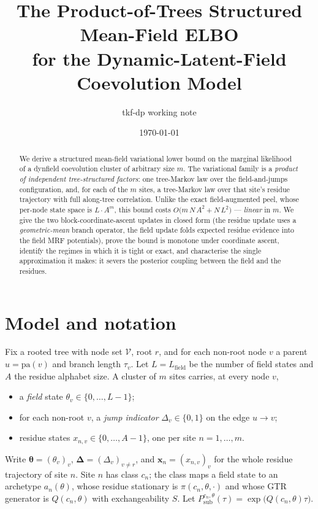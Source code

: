 \documentclass[11pt]{article}
\title{The Product-of-Trees Structured Mean-Field ELBO\\for the Dynamic-Latent-Field Coevolution Model}
\author{tkf-dp working note}
\date{\today}
\newcommand{\btheta}{\bm{\theta}}
\newcommand{\bDelta}{\bm{\Delta}}
\newcommand{\bx}{\bm{x}}
\newcommand{\pa}{\mathrm{pa}}
\newcommand{\Psub}{P_{\mathrm{sub}}}
\begin{document}
\maketitle

\begin{abstract}
We derive a structured mean-field variational lower bound on the marginal
likelihood of a dynfield coevolution cluster of arbitrary size $m$. The
variational family is a \emph{product of independent tree-structured
factors}: one tree-Markov law over the field-and-jumps configuration, and,
for each of the $m$ sites, a tree-Markov law over that site's residue
trajectory with full along-tree correlation. Unlike the exact
field-augmented peel, whose per-node state space is $L\cdot A^{m}$, this
bound costs $O\!\big(m\,N\,A^{2}+N\,L^{2}\big)$ --- \emph{linear} in $m$.
We give the two block-coordinate-ascent updates in closed form (the residue
update uses a \emph{geometric-mean} branch operator, the field update folds
expected residue evidence into the field MRF potentials), prove the bound is
monotone under coordinate ascent, identify the regimes in which it is tight
or exact, and characterise the single approximation it makes: it severs the
posterior coupling between the field and the residues.
\end{abstract}

\section{Model and notation}

Fix a rooted tree with node set $\mathcal V$, root $r$, and for each
non-root node $v$ a parent $u=\pa(v)$ and branch length $\tau_v$. Let
$L=L_{\mathrm{field}}$ be the number of field states and $A$ the residue
alphabet size. A cluster of $m$ sites carries, at every node $v$,
\begin{itemize}
\item a \emph{field} state $\theta_v\in\{0,\dots,L-1\}$;
\item for each non-root $v$, a \emph{jump indicator} $\Delta_v\in\{0,1\}$ on
      the edge $u\to v$;
\item residue states $x_{n,v}\in\{0,\dots,A-1\}$, one per site $n=1,\dots,m$.
\end{itemize}
Write $\btheta=(\theta_v)_v$, $\bDelta=(\Delta_v)_{v\neq r}$, and
$\bx_n=(x_{n,v})_v$ for the whole residue trajectory of site $n$. Site $n$
has class $c_n$; the class maps a field state to an archetype
$a_n(\theta)$, whose residue stationary is $\pi(c_n,\theta,\cdot)$ and whose
GTR generator is $Q(c_n,\theta)$ with exchangeability $S$. Let
$\Psub^{c_n,\theta}(\tau)=\exp\!\big(Q(c_n,\theta)\tau\big)$.
\end{document}
